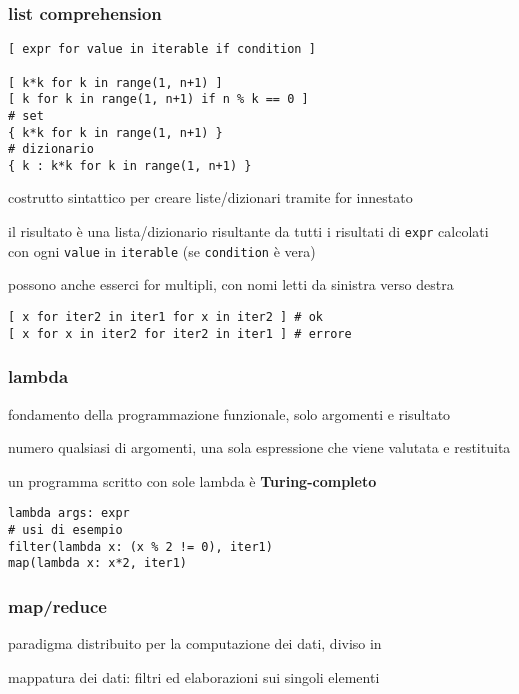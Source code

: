 \subsubsection{list comprehension}

\begin{verbatim}
[ expr for value in iterable if condition ]

[ k*k for k in range(1, n+1) ]
[ k for k in range(1, n+1) if n % k == 0 ]
# set
{ k*k for k in range(1, n+1) }
# dizionario
{ k : k*k for k in range(1, n+1) }
\end{verbatim}

costrutto sintattico per creare liste/dizionari tramite for innestato

il risultato \`e una lista/dizionario risultante da tutti i risultati di \texttt{expr} calcolati con ogni \texttt{value} in \texttt{iterable} (se \texttt{condition} \`e vera)

possono anche esserci for multipli, con nomi letti da sinistra verso destra

\begin{verbatim}
[ x for iter2 in iter1 for x in iter2 ] # ok
[ x for x in iter2 for iter2 in iter1 ] # errore
\end{verbatim}

\subsubsection{lambda}

fondamento della programmazione funzionale, solo argomenti e risultato

numero qualsiasi di argomenti, una sola espressione che viene valutata e restituita

un programma scritto con sole lambda \`e \textbf{Turing-completo}

\begin{verbatim}
lambda args: expr
# usi di esempio
filter(lambda x: (x % 2 != 0), iter1)
map(lambda x: x*2, iter1)
\end{verbatim}

\subsubsection{map/reduce}

paradigma distribuito per la computazione dei dati, diviso in

mappatura dei dati: filtri ed elaborazioni sui singoli elementi


